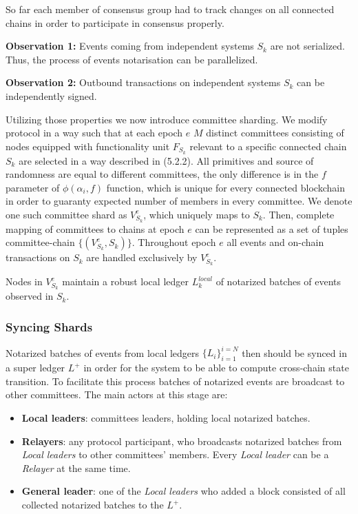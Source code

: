So far each member of consensus group had to track changes on all connected chains in order to participate in consensus properly.

\textbf{Observation 1:} Events coming from independent systems $S_k$ are not serialized.
Thus, the process of events notarisation can be parallelized.

\textbf{Observation 2:} Outbound transactions on independent systems $S_k$ can be independently signed.

Utilizing those properties we now introduce committee sharding.
We modify protocol in a way such that at each epoch $e$ $M$ distinct committees consisting of nodes equipped with functionality unit $F_{S_k}$ relevant to a specific connected chain $S_k$ are selected in a way described in (5.2.2).
All primitives and source of randomness are equal to different committees, the only difference is in the $f$ parameter of $\phi(\alpha_i, f)$ function, which is unique for every connected blockchain in order to guaranty expected number of members in every committee.
We denote one such committee shard as $V^{e}_{S_k}$, which uniquely maps to $S_k$.
Then, complete mapping of committees to chains at epoch $e$ can be represented as a set of tuples committee-chain $\{(V^{e}_{S_k}, S_k)\}$.
Throughout epoch $e$ all events and on-chain transactions on $S_k$ are handled exclusively by $V^{e}_{S_k}$.

Nodes in $V^{e}_{S_k}$ maintain a robust local ledger $L^{local}_k$ of notarized batches of events observed in $S_k$.

\subsubsection{Syncing Shards}

Notarized batches of events from local ledgers $\{L_i\}_{i=1}^{i=N}$ then should be synced in a super ledger $L^+$ in order for the system to be able to compute cross-chain state transition.
To facilitate this process batches of notarized events are broadcast to other committees.
The main actors at this stage are:
\begin{itemize}
    \item \textbf{Local leaders}: committees leaders, holding local notarized batches.
    \item \textbf{Relayers}: any protocol participant, who broadcasts notarized batches from \emph{Local leaders} to other committees' members.
    Every \emph{Local leader} can be a \emph{Relayer} at the same time.
    \item \textbf{General leader}: one of the \emph{Local leaders} who added a block consisted of all collected notarized batches to the $L^+$.
\end{itemize}

